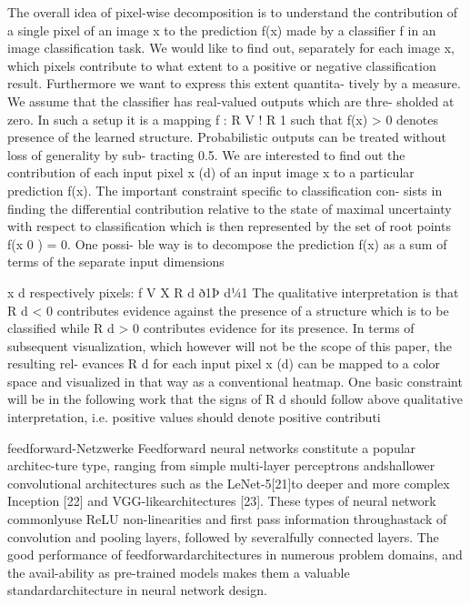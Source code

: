 \documentclass[twoside, 12pt,a4paper]{article}
\numberwithin{equation}{section}
\begin{document}
	
	The overall idea of pixel-wise decomposition is to understand the contribution of a single pixel
	of an image x to the prediction f(x) made by a classifier f in an image classification task. We
	would like to find out, separately for each image x, which pixels contribute to what extent to a
	positive or negative classification result. Furthermore we want to express this extent quantita-
	tively by a measure. We assume that the classifier has real-valued outputs which are thre-
	sholded at zero. In such a setup it is a mapping f : R V ! R 1 such that f(x) > 0 denotes presence
	of the learned structure. Probabilistic outputs can be treated without loss of generality by sub-
	tracting 0.5. We are interested to find out the contribution of each input pixel x (d) of an input
	image x to a particular prediction f(x). The important constraint specific to classification con-
	sists in finding the differential contribution relative to the state of maximal uncertainty with
	respect to classification which is then represented by the set of root points f(x 0 ) = 0. One possi-
	ble way is to decompose the prediction f(x) as a sum of terms of the separate input dimensions
	
	x d respectively pixels:
	f 
	V
	X
	R d
	ð1Þ
	d1⁄41
	The qualitative interpretation is that R d < 0 contributes evidence against the presence of a
	structure which is to be classified while R d > 0 contributes evidence for its presence. In terms
	of subsequent visualization, which however will not be the scope of this paper, the resulting rel-
	evances R d for each input pixel x (d) can be mapped to a color space and visualized in that way
	as a conventional heatmap. One basic constraint will be in the following work that the signs of
	R d should follow above qualitative interpretation, i.e. positive values should denote positive
	contributi
	
	feedforward-Netzwerke
	Feedforward neural networks constitute a popular architec-ture type, ranging from simple multi-layer perceptrons andshallower convolutional architectures such as the LeNet-5[21]to deeper and more complex Inception [22] and VGG-likearchitectures [23]. These types of neural network commonlyuse ReLU non-linearities and first pass information throughastack of convolution and pooling layers, followed by severalfully connected layers. The good performance of feedforwardarchitectures in numerous problem domains, and the avail-ability as pre-trained models makes them a valuable standardarchitecture in neural network design.
	
\end{document}
